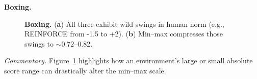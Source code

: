 \noindent \textbf{Boxing.}
\begin{figure} 
	\centering
	\quad
	\caption{\textbf{Boxing.}
		(\textbf{a}) All three exhibit wild swings in human norm (e.g., REINFORCE from -1.5 to +2).
		(\textbf{b}) Min--max compresses those swings to \(\sim0.72\)--0.82.}
	\label{fig:boxing_combined}
\end{figure}

\noindent
\emph{Commentary.} Figure~\ref{fig:boxing_combined} highlights how an environment’s large or small absolute score range can drastically alter the min--max scale.

\medskip

